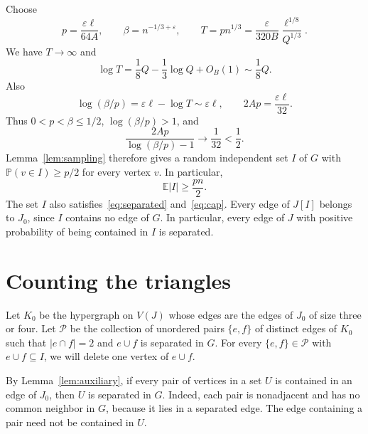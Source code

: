 \documentclass[11pt]{article}
\numberwithin{equation}{section}
\theoremstyle{remark}
\newcommand{\E}{\mathbb E}
\newcommand{\Pp}{\mathbb P}
\begin{document}
Choose
\begin{equation}\label{eq:p-beta-T}
 p=\frac{\varepsilon\ell}{64A},\qquad
 \beta=n^{-1/3+\varepsilon},\qquad
 T=pn^{1/3}=\frac{\varepsilon}{320B}\frac{\ell^{1/8}}{Q^{1/3}}.
\end{equation}
We have $T\to\infty$ and
\begin{equation}\label{eq:logs}
 \log T=\frac18Q-\frac13\log Q+O_B(1)\sim\frac18Q.
\end{equation}
Also
\[
 \log(\beta/p)=\varepsilon\ell-\log T\sim\varepsilon\ell,
 \qquad 2Ap=\frac{\varepsilon\ell}{32}.
\]
Thus $0<p<\beta\le1/2$, $\log(\beta/p)>1$, and
\[
 \frac{2Ap}{\log(\beta/p)-1}\longrightarrow\frac1{32}<\frac12.
\]
Lemma~\ref{lem:sampling} therefore gives a random independent set $I$ of $G$ with $\Pp(v\in I)\ge p/2$ for every vertex $v$. In particular,
\begin{equation}\label{eq:sample-size}
 \E|I|\ge\frac{pn}{2}.
\end{equation}
The set $I$ also satisfies~\eqref{eq:separated} and~\eqref{eq:cap}. Every edge of $J[I]$ belongs to $J_0$, since $I$ contains no edge of $G$. In particular, every edge of $J$ with positive probability of being contained in $I$ is separated.

\section{Counting the triangles}\label{sec:configurations}

Let $K_0$ be the hypergraph on $V(J)$ whose edges are the edges of $J_0$ of size three or four. Let $\mathcal P$ be the collection of unordered pairs $\{e,f\}$ of distinct edges of $K_0$ such that $|e\cap f|=2$ and $e\cup f$ is separated in $G$. For every $\{e,f\}\in\mathcal P$ with $e\cup f\subseteq I$, we will delete one vertex of $e\cup f$.

By Lemma~\ref{lem:auxiliary}, if every pair of vertices in a set $U$ is contained in an edge of $J_0$, then $U$ is separated in $G$. Indeed, each pair is nonadjacent and has no common neighbor in $G$, because it lies in a separated edge. The edge containing a pair need not be contained in $U$.
\end{document}
